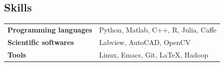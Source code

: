 \documentclass[margin,line]{resume}
\begin{document}
\begin{resume}
 \section{\mysidestyle Skills}
\vspace{0.5em}
	\begin{tabular}{ll }
\textbf{Programming languages} &Python, Matlab, C++, R, Julia, Caffe\\
\textbf{Scientific softwares}& Labview,  AutoCAD, OpenCV\\
	\textbf{Tools}& Linux, Emacs, Git, \LaTeX, Hadoop
        \end{tabular}
    	

 	

 	       
\end{resume}   
\end{document}
